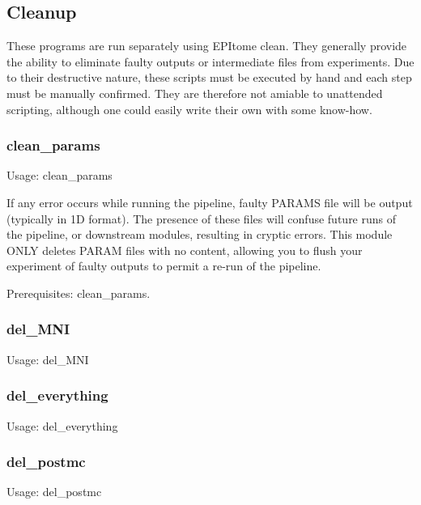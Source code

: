 \documentclass[final,titlepage,letterpaper,oneside,12pt]{article}
\renewcommand{\texttt}[2][BrickRed]{\textcolor{#1}{\ttfamily #2}}%
\begin{document}
\subsection{Cleanup}

These programs are run separately using \texttt{EPItome clean}. They generally provide the ability to eliminate faulty outputs or intermediate files from experiments. Due to their destructive nature, these scripts must be executed by hand and each step must be manually confirmed. They are therefore not amiable to unattended scripting, although one could easily write their own with some know-how. 


\subsubsection{clean\_params}
Usage: \texttt{clean\_params}

\noindent If any error occurs while running the pipeline, faulty PARAMS file will be output (typically in 1D format). The presence of these files will confuse future runs of the pipeline, or downstream modules, resulting in cryptic errors. This module ONLY deletes PARAM files with no content, allowing you to flush your experiment of faulty outputs to permit a re-run of the pipeline.

Prerequisites: \texttt{clean\_params}.

\subsubsection{del\_MNI}
Usage: \texttt{del\_MNI}

\subsubsection{del\_everything}
Usage: \texttt{del\_everything}

\subsubsection{del\_postmc}
Usage: \texttt{del\_postmc}

\end{document}
